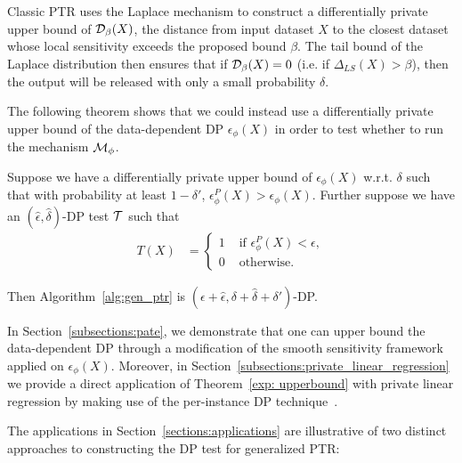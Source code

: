 
Classic PTR uses the Laplace mechanism to construct a differentially private upper bound of $\mathcal{D}_{\beta}(X)$, the distance from input dataset $X$ to the closest dataset whose local sensitivity exceeds the proposed bound $\beta$. The tail bound of the Laplace distribution then ensures that if $\mathcal{D}_{\beta}(X) = 0$ (i.e. if $\Delta_{LS}(X) > \beta$), then the output will be released with only a small probability $\delta$.

The following theorem shows that we could instead use a differentially private upper bound of the data-dependent DP $\epsilon_{\phi}(X)$ in order to test whether to run the mechanism $\mathcal{M}_{\phi}$.

\begin{theorem}\label{exp: upperbound}
Suppose we have a differentially private upper bound of $\epsilon_\phi(X)$ w.r.t. $\delta$ such that with probability at least $1-\delta'$, $\epsilon_{\phi }^P(X)>\epsilon_{\phi}(X)$. Further suppose we have an $(\hat{\epsilon}, \hat{\delta})$-DP test $\mathcal{T}$ such that
\begin{align*}
    T(X) &= \begin{cases}
    1 & \text{ if } \epsilon_{\phi }^P(X) < \epsilon, \\
    0 & \text{ otherwise}.
    \end{cases}
\end{align*}

Then Algorithm~\ref{alg:gen_ptr} is $(\epsilon +\hat{\epsilon}, \delta +\hat{\delta} + \delta')$-DP. %
\end{theorem}


In Section~\ref{subsections:pate}, we demonstrate that one can upper bound the data-dependent DP through a modification of the smooth sensitivity framework applied on $\epsilon_\phi(X)$. Moreover, in Section~\ref{subsections:private_linear_regression} we provide a direct application of Theorem~\ref{exp: upperbound} with private linear regression by making use of the per-instance DP technique~\citep{wang2017per}.

The applications in Section~\ref{sections:applications} are illustrative of two distinct approaches to constructing the DP test for generalized PTR:

